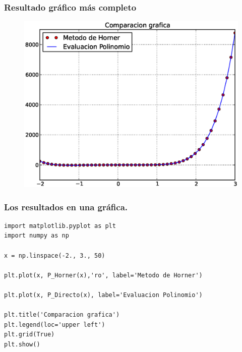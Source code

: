 \begin{frame}[fragile]
\frametitle{Resultado gráfico más completo}
\begin{figure}
	\centering
	\includegraphics[scale=0.5]{Imagenes/MetodoHorner.eps} 
\end{figure}
\end{frame}
\begin{frame}
\frametitle{Los resultados en una gráfica.}
\begin{lstlisting}[caption=Elaboración de la gráfica, style=codigopython]
import matplotlib.pyplot as plt
import numpy as np

x = np.linspace(-2., 3., 50)

plt.plot(x, P_Horner(x),'ro', label='Metodo de Horner')

plt.plot(x, P_Directo(x), label='Evaluacion Polinomio')

plt.title('Comparacion grafica')
plt.legend(loc='upper left')
plt.grid(True)
plt.show()
\end{lstlisting}
\end{frame}
